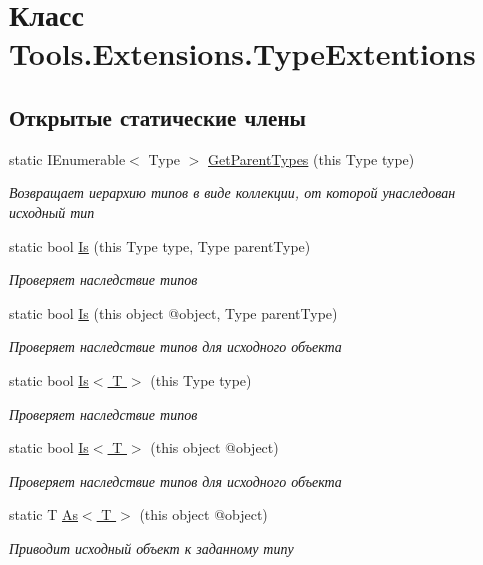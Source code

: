 \hypertarget{class_tools_1_1_extensions_1_1_type_extentions}{}\section{Класс Tools.\+Extensions.\+Type\+Extentions}
\label{class_tools_1_1_extensions_1_1_type_extentions}
\subsection*{Открытые статические члены}
\begin{DoxyCompactItemize}
\item 
static I\+Enumerable$<$ Type $>$ \hyperlink{class_tools_1_1_extensions_1_1_type_extentions_ac6091e29fcbbba209a3d8cd7777ff9b1}{Get\+Parent\+Types} (this Type type)
\begin{DoxyCompactList}\small\item\em Возвращает иерархию типов в виде коллекции, от которой унаследован исходный тип \end{DoxyCompactList}\item 
static bool \hyperlink{class_tools_1_1_extensions_1_1_type_extentions_a017a96cb151575a7764579ca8e229361}{Is} (this Type type, Type parent\+Type)
\begin{DoxyCompactList}\small\item\em Проверяет наследствие типов \end{DoxyCompactList}\item 
static bool \hyperlink{class_tools_1_1_extensions_1_1_type_extentions_abc962196a457621d9b9bad1498cd0903}{Is} (this object @object, Type parent\+Type)
\begin{DoxyCompactList}\small\item\em Проверяет наследствие типов для исходного объекта \end{DoxyCompactList}\item 
static bool \hyperlink{class_tools_1_1_extensions_1_1_type_extentions_a180b1ab0f9c050aac47501f8c4973936}{Is$<$ T $>$} (this Type type)
\begin{DoxyCompactList}\small\item\em Проверяет наследствие типов \end{DoxyCompactList}\item 
static bool \hyperlink{class_tools_1_1_extensions_1_1_type_extentions_a7b5dcdb969ae0f6b19dedbfd4f21df64}{Is$<$ T $>$} (this object @object)
\begin{DoxyCompactList}\small\item\em Проверяет наследствие типов для исходного объекта \end{DoxyCompactList}\item 
static T \hyperlink{class_tools_1_1_extensions_1_1_type_extentions_afebefec48afd27496ef33e4428cdd632}{As$<$ T $>$} (this object @object)
\begin{DoxyCompactList}\small\item\em Приводит исходный объект к заданному типу \end{DoxyCompactList}\end{DoxyCompactItemize}


